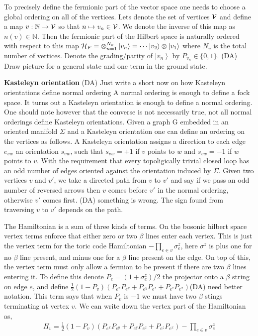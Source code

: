 \documentclass[12pt,a4paper]{article}
\newcommand{\tp}{\otimes}
\newcommand{\ket}[1]{\ensuremath{\left|#1\right\rangle}}
\newcommand{\dave}[1]{{\color{ao(english)}\footnotesize{(DA) #1}}}
\begin{document}
{{To precisely define the fermionic part of the vector space one needs to choose a global ordering on all of the vertices. Lets denote the set of vertices $ \cal{V}$ and define a map $v: \mathbb{N} \rightarrow \cal{V}$ so that $n \mapsto v_n \in \cal{V}$. We denote the inverse of this map as $n(v) \in \mathbb{N}$. 
Then the fermionic part of the Hilbert space is naturally ordered with respect to this map ${\cal{H}}_F = \tp_{n=1}^{N_v} \ket{v_n} = \cdots \ket{v_2} \tp \ket{v_1}$ where $N_v$ is the total number of vertices.
Denote the grading/parity of $\ket{v_n}$ by $P_{v_n} \in \{ 0,1\} $.
\dave{Draw picture for a general state and one term in the ground state.}

{\bf Kasteleyn orientation}
\dave{Just write a short now on how Kasteleyn orientations define normal ordering}
A normal ordering is enough to define a fock space. It turns out a Kasteleyn orientation is enough to define a normal ordering. One should note however that the converse is not necessarily true, not all normal orderings define Kasteleyn orientations. 
Given a graph {\cal G} embedded in an oriented manifold $\Sigma$ and a Kasteleyn orientation one can define an ordering on the vertices as follows. 
A Kasteleyn orientation assigns a direction to each edge $e_{vw}$ an orientation $s_{vw}$, such that $s_{vw} = +1$ if $v$ points to $w$ and $s_{vw}=-1$ if $w$ points to $v$. 
With the requirement that every topoligically trivial closed loop has an odd number of edges oriented against the orientation induced by $\Sigma$.
Given two vertices $v$ and $v'$, we take a directed path from $v$ to $v'$ and say if we pass an odd number of reversed arrows then $v$ comes before $v'$ in the normal ordering, otherwise $v'$ comes first. 
\dave{something is wrong. The sign found from traversing $v$ to $v'$ depends on the path.}

The Hamiltonian is a sum of three kinds of terms. 
On the bosonic hilbert space vertex terms enforce that either zero or two $\beta$ lines enter each vertex. This is just the vertex term for the toric code Hamiltonian $-\prod_{e \in v} \sigma_e^z$, here $\sigma^z$ is plus one for no $\beta$ line present, and minus one for a $\beta$ line present on the edge. 
On top of this, the vertex term must only allow a fermion to be present if there are two $\beta$ lines entering it.
To define this denote $P_e = (1+\sigma^z_e)/2$ the projector onto a $\beta$ string on edge $e$, and define $\frac{1}{2}(1-P_v)(P_{e^x}P_{e^y}+P_{e^y}P_{e^z}+P_{e^z}P_{e^x})$\dave{need better notation}. This term says that when $P_v$ is $-1$ we must have two $\beta$ stings terminating at vertex  $v$.
We can write down the vertex part of the Hamiltonian as,
\begin{align}
H_v = \frac{1}{2}(1-P_v)(P_{e^x}P_{e^y}+P_{e^y}P_{e^z}+P_{e^z}P_{e^x}) - \prod_{e \in v} \sigma_e^z
\end{align}

}}
\end{document}
